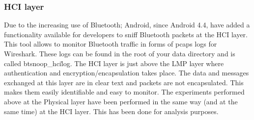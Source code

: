 \subsubsection{HCI layer}
Due to the increasing use of Bluetooth; Android, since Android 4.4, have added a functionality available for developers to sniff Bluetooth packets at the HCI layer. This tool allows to monitor Bluetooth traffic in forms of pcaps logs for Wireshark. These logs can be found in the root of your data directory and is called btsnoop\_hci\.log.\pend
The HCI layer is just above the LMP layer where authentication and encryption/encapsulation takes place. The data and messages exchanged at this layer are in clear text and packets are not encapsulated. This makes them easily identifiable and easy to monitor. \pend
The experiments performed above at the Physical layer have been performed in the same way (and at the same time) at the HCI layer. This has been done for analysis purposes.
	